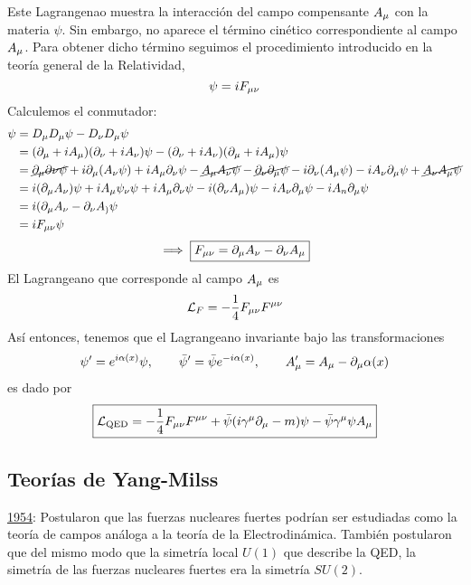 Este Lagrangenao muestra la interacción del campo compensante $A_\mu $ con la materia $\psi$. Sin embargo, no aparece el término cinético correspondiente al campo $A_\mu $. Para obtener dicho término seguimos el procedimiento introducido en la teoría general de la Relatividad,
\begin{equation}
  [D_\m ,D_\n ]\psi=iF_{\m\n }
\end{equation}
Calculemos el conmutador:
\begin{align*}
  [D_\m ,D_\n ]\psi&=D_\m D_\m \psi-D_\n D_\m \psi\\
  &=(\partial_\m +iA_\m )(\partial_\n  +iA_\n  )\psi -(\partial_\n  +iA_\n  )(\partial_\m +iA_\m )\psi\\
  &=\cancel{\partial_\m \partial\n \psi}+i\partial_\m (A_\n \psi)+iA_\m \partial_\n \psi-\cancel{A_\m A_\n \psi}-\cancel{\partial_\n \partial_\m \psi}-i\partial_\n (A_\m \psi)-iA_\n \partial_\m \psi+\cancel{A_\n A_\m \psi}\\
  &=i(\partial_\m A_\n )\psi+iA_\m \psi_\n \psi+iA_\m \partial_\n \psi-i(\partial_\n A_\m )\psi-iA_\n \partial_\m \psi-iA_n\partial_\m \psi\\
  &=i(\partial_\m A_\n -\partial_\n A_\mathcal)\psi\\
  &=iF_{\m\n }\psi
\end{align*}
\begin{equation}
  \implies \boxed{F_{\mu\nu}=\partial_\mu A_\nu -\partial_\nu A_\mu }
\end{equation}
El Lagrangeano que corresponde al campo $A_\mu $ es
\begin{equation}
  \mathcal{L}_F=-\frac{1}{4}F_{\mu\nu}F^{\mu\nu }
\end{equation}
Así entonces, tenemos que el Lagrangeano invariante bajo las transformaciones
\begin{equation}
  \psi'=e^{i\alpha (x)}\psi,\qquad \bar{\psi}'=\bar{\psi}e^{-i\alpha (x)},\qquad A_\mu'=A_\mu -\partial_\mu \alpha(x)
\end{equation}
es dado por
\begin{equation}
 \boxed{ \mathcal{L}_{\rm QED}=-\frac{1}{4}F_{\mu\nu }F^{\mu\nu }+\bar{\psi}(i\gamma^\mu \partial_\mu -m)\psi-\bar{\psi}\gamma^\mu \psi A_\mu }
\end{equation}

\subsection{Teorías de Yang-Milss}
\underline{1954}: Postularon que las fuerzas nucleares fuertes podrían ser estudiadas como la teoría de campos análoga a la teoría de la Electrodinámica. También postularon que del mismo modo que la simetría local $U(1)$ que describe la QED, la simetría de las fuerzas nucleares fuertes era la simetría $SU(2)$.

